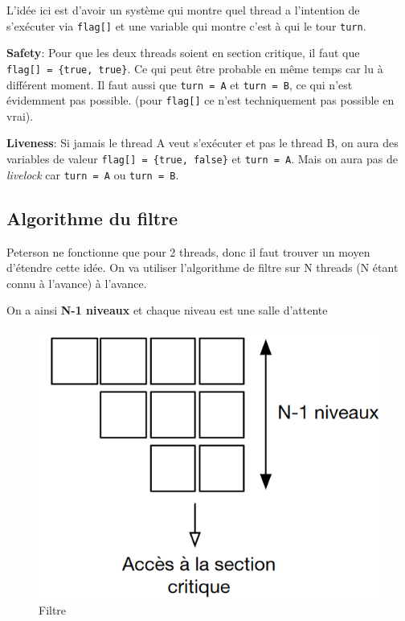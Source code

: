 L'idée ici est d'avoir un système qui montre quel thread a l'intention
de s'exécuter via \texttt{flag{[}{]}} et une variable qui montre c'est à
qui le tour \texttt{turn}.

\textbf{Safety}: Pour que les deux threads soient en section critique,
il faut que \texttt{flag{[}{]}\ =\ \{true,\ true\}}. Ce qui peut être
probable en même temps car lu à différent moment. Il faut aussi que
\texttt{turn\ =\ A} et \texttt{turn\ =\ B}, ce qui n'est évidemment pas
possible. (pour \texttt{flag{[}{]}} ce n'est techniquement pas possible
en vrai).

\textbf{Liveness}: Si jamais le thread A veut s'exécuter et pas le
thread B, on aura des variables de valeur
\texttt{flag{[}{]}\ =\ \{true,\ false\}} et \texttt{turn\ =\ A}. Mais on
aura pas de \emph{livelock} car \texttt{turn\ =\ A} ou
\texttt{turn\ =\ B}.

\subsection{Algorithme du filtre}\label{algorithme-du-filtre}

Peterson ne fonctionne que pour 2 threads, donc il faut trouver un moyen
d'étendre cette idée. On va utiliser l'algorithme de filtre sur N
threads (N étant connu à l'avance) à l'avance.

On a ainsi \textbf{N-1 niveaux} et chaque niveau est une salle d'attente

\begin{figure}
\centering
\includegraphics{image-25.png}
\caption{Filtre}
\end{figure}

